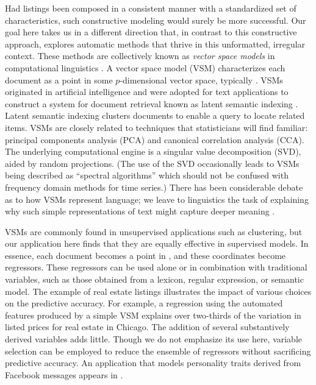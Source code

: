 \documentclass[12pt]{article}
\begin{document}
 Had listings been composed in a consistent manner with a standardized set of
 characteristics, such constructive modeling would surely be more successful.
  Our goal here takes us in a different direction that, in contrast to this
 constructive approach, explores automatic methods that thrive in this
 unformatted, irregular context.  These methods are collectively known as {\em
 vector space models} in computational linguistics \citep[e.g.][]{turney10}.  A
 vector space model (VSM) characterizes each document as a point in some
 $p$-dimensional vector space, typically \Rp.  VSMs originated in artificial
 intelligence and were adopted for text applications to construct a system for
 document retrieval known as latent semantic indexing \citep{deerwester88}.
  Latent semantic indexing clusters documents to enable a query to locate
 related items.  VSMs are closely related to techniques that statisticians will
 find familiar: principal components analysis (PCA) and canonical correlation
 analysis (CCA).  The underlying computational engine is a singular value
 decomposition (SVD), aided by random projections.  (The use of the SVD
 occasionally leads to VSMs being described as ``spectral algorithms'' which
 should not be confused with frequency domain methods for time series.)  There
 has been considerable debate as to how VSMs represent language; we leave to
 linguistics the task of explaining why such simple representations of text
 might capture deeper meaning \citep{deerwester90, landauer97, bullinaria07,
 turney10}.


 VSMs are commonly found in unsupervised applications such as clustering, but
 our application here finds that they are equally effective in supervised
 models.  In essence, each document becomes a point in \Rp, and these
 coordinates become regressors.  These regressors can be used alone or in
 combination with traditional variables, such as those obtained from a lexicon,
 regular expression, or semantic model.  The example of real estate listings
 illustrates the impact of various choices on the predictive accuracy.  For
 example, a regression using the automated features produced by a simple VSM
 explains over two-thirds of the variation in listed prices for real estate in
 Chicago.  The addition of several substantively derived variables adds little.
  Though we do not emphasize its use here, variable selection can be employed to
 reduce the ensemble of regressors without sacrificing predictive accuracy.  An application that models personality traits derived from Facebook
 messages appears in \citet{ungar13}.
\end{document}
